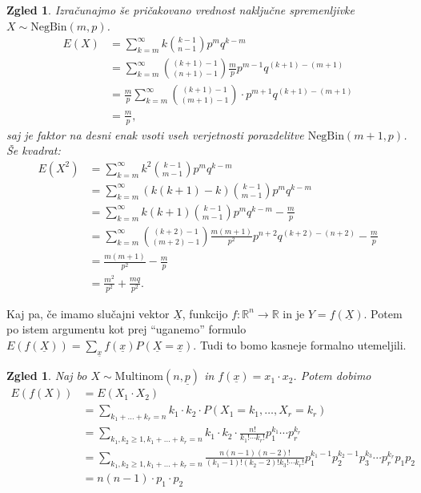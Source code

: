 \documentclass[10pt, a4paper]{article}
\newtheorem{zgled}[izr]{Zgled}
\newcommand{\R}{\mathbb {R}}
\begin{document}
\begin{zgled}
  Izračunajmo še pričakovano vrednost naključne spremenljivke $X \sim \mathrm{NegBin} (m, p)$.
  \begin{align*}
    E(X) &= \sum_{k = m} ^\infty k \binom{k - 1}{n - 1} p^m q^{k - m}\\
    &= \sum_{k = m} ^\infty \binom{(k + 1) - 1}{(n + 1) - 1} \frac{m}{p} p^{m - 1} q^{(k + 1) - (m + 1)}\\
    &= \frac{m}{p} \sum_{k = m} ^\infty \binom{(k + 1) - 1}{(m + 1) - 1} \cdot p^{m + 1} q^{(k + 1) - (m + 1)}\\
    &= \frac{m}{p}, 
  \end{align*}
  saj je faktor na desni enak vsoti vseh verjetnosti porazdelitve $\mathrm{NegBin} (m + 1, p)$.
  Še kvadrat:
  \begin{align*}
    E(X^2) &= \sum_{k = m} ^\infty k^2 \binom{k - 1}{m - 1} p^m q^{k - m}\\
    &= \sum_{k = m} ^\infty (k(k + 1) - k) \binom{k - 1}{m - 1} p^m q^{k - m}\\
    &= \sum_{k = m} ^\infty k(k + 1) \binom{k - 1}{m - 1} p^m q^{k - m} - \frac{m}{p}\\
    &= \sum_{k = m} ^\infty \binom{(k + 2) - 1}{(m + 2) - 1} \frac{m(m + 1)}{p^2} p^{n + 2} q^{(k + 2) - (n + 2)} - \frac{m}{p}\\
    &= \frac{m(m + 1)}{p^2} - \frac{m}{p}\\
    &= \frac{m^2}{p^2} + \frac{mq}{p^2}.
  \end{align*}
\end{zgled}

Kaj pa, če imamo slučajni vektor $\underline{X}$, funkcijo $f: \R^n \to \R$ in je $Y = f(\underline{X})$.
Potem po istem argumentu kot prej "`uganemo"' formulo $E(f(\underline{X})) = \sum_{\underline{x}} f(\underline{x}) P(\underline{X} = \underline{x})$.
Tudi to bomo kasneje formalno utemeljili.

\begin{zgled}
  Naj bo $X \sim \mathrm{Multinom} (n, \underline{p})$ in $f(\underline{x}) = x_1 \cdot x_2$.
  Potem dobimo 
  \begin{align*}
    E(f(X)) &= E(X_1 \cdot X_2)\\
    &= \sum_{k_1 + \dots + k_r = n} k_1 \cdot k_2 \cdot P(X_1 = k_1, \dots, X_r = k_r)\\
    &= \sum_{k_1, k_2 \geq 1, k_1 + \dots + k_r = n} k_1 \cdot k_2 \cdot \frac{n!}{k_1! \cdots k_r!} p_1^{k_1} \cdots p_r^{k_r}\\
    &= \sum_{k_1, k_2 \geq 1, k_1 + \dots + k_r = n} \frac{n (n - 1) (n -2)!}{(k_1 - 1)! (k_2 - 2)! k_3! \cdots k_r!} p_1^{k_1 - 1} p_2^{k_2 - 1} p_3^{k_3} \cdots p_r^{k_r} p_1 p_2\\
    &= n(n - 1) \cdot p_1 \cdot p_2 
  \end{align*}
\end{zgled}
\end{document}
